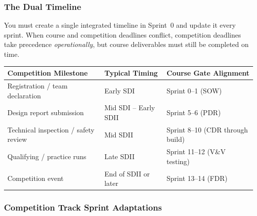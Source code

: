 \subsubsection{The Dual Timeline}

You must create a single integrated timeline in Sprint~0 and update it every sprint. When course and competition deadlines conflict, competition deadlines take precedence \emph{operationally}, but course deliverables must still be completed on time.

{\centering\small
\begin{longtable}{>{\raggedright\arraybackslash}p{3.2cm} >{\raggedright\arraybackslash}p{3.5cm} >{\raggedright\arraybackslash}p{4.5cm}}
\toprule
\textbf{Competition Milestone} & \textbf{Typical Timing} & \textbf{Course Gate Alignment} \\
\midrule
\endhead
Registration / team declaration & Early SDI & Sprint 0--1 (SOW) \\
Design report submission & Mid SDI -- Early SDII & Sprint 5--6 (PDR) \\
Technical inspection / safety review & Mid SDII & Sprint 8--10 (CDR through build) \\
Qualifying / practice runs & Late SDII & Sprint 11--12 (V\&V testing) \\
Competition event & End of SDII or later & Sprint 13--14 (FDR) \\
\bottomrule
\end{longtable}
}

\subsubsection{Competition Track Sprint Adaptations}

